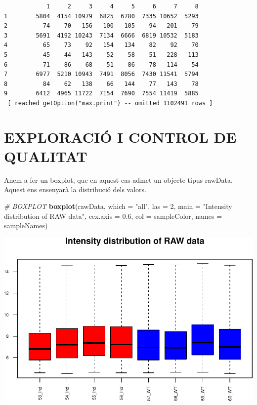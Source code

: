 \documentclass[
]{article}
\newenvironment{Shaded}{\begin{snugshade}}{\end{snugshade}}
\newcommand{\AttributeTok}[1]{\textcolor[rgb]{0.13,0.29,0.53}{#1}}
\newcommand{\CommentTok}[1]{\textcolor[rgb]{0.56,0.35,0.01}{\textit{#1}}}
\newcommand{\DecValTok}[1]{\textcolor[rgb]{0.00,0.00,0.81}{#1}}
\newcommand{\FloatTok}[1]{\textcolor[rgb]{0.00,0.00,0.81}{#1}}
\newcommand{\FunctionTok}[1]{\textcolor[rgb]{0.13,0.29,0.53}{\textbf{#1}}}
\newcommand{\NormalTok}[1]{#1}
\newcommand{\StringTok}[1]{\textcolor[rgb]{0.31,0.60,0.02}{#1}}
\begin{document}
\begin{verbatim}
            1     2     3     4     5     6     7     8
1        5804  4154 10979  6825  6780  7335 10652  5293
2          74    70   156   100   105    94   201    79
3        5691  4192 10243  7134  6666  6819 10532  5183
4          65    73    92   154   134    82    92    70
5          45    44   143    52    58    51   228   113
6          71    86    68    51    86    78   114    54
7        6977  5210 10943  7491  8056  7430 11541  5794
8          84    62   138    66   144    77   143    78
9        6412  4965 11722  7154  7690  7554 11419  5885
 [ reached getOption("max.print") -- omitted 1102491 rows ]
\end{verbatim}

\section{EXPLORACIÓ I CONTROL DE
QUALITAT}\label{exploraciuxf3-i-control-de-qualitat}

Anem a fer un boxplot, que en aquest cas admet un objecte tipus rawData.
Aquest ens ensenyarà la distribució dels valors.

\begin{Shaded}
\begin{Highlighting}[]
\CommentTok{\# BOXPLOT}
\FunctionTok{boxplot}\NormalTok{(rawData, }\AttributeTok{which =} \StringTok{"all"}\NormalTok{, }\AttributeTok{las =} \DecValTok{2}\NormalTok{, }\AttributeTok{main =} \StringTok{"Intensity distribution of RAW data"}\NormalTok{,}
    \AttributeTok{cex.axis =} \FloatTok{0.6}\NormalTok{, }\AttributeTok{col =}\NormalTok{ sampleColor, }\AttributeTok{names =}\NormalTok{ sampleNames)}
\end{Highlighting}
\end{Shaded}

\includegraphics{APUNTS_files/figure-latex/graficosCalidad-1.pdf}
\end{document}
